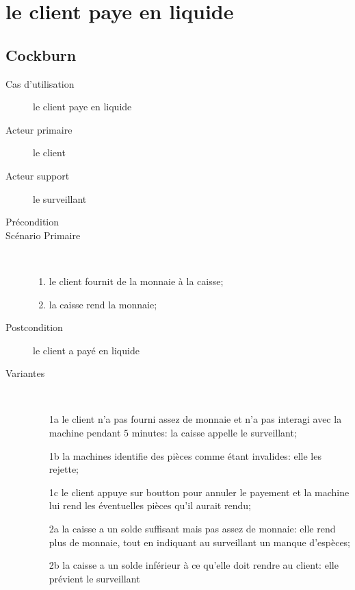 \documentclass[a4paper]{article}
\begin{document}
\newpage

\section{le client paye en liquide}
\subsection{Cockburn}
\begin{description}
	\item[Cas d'utilisation] le client paye en liquide
	\item[Acteur primaire] le client
	\item[Acteur support] le surveillant
	\item[Pr\'econdition]
	\item[Sc\'enario Primaire] \
	\begin{enumerate}
		\item le client fournit de la monnaie \`a la caisse;
		\item la caisse rend la monnaie;
	\end{enumerate}
	\item[Postcondition] le client a pay\'e en liquide
	\item[Variantes] \
	\begin{enumerate}
		\item[1a] le client n'a pas fourni assez de monnaie et n'a
			pas interagi avec la machine pendant $5$ minutes: la
			caisse appelle le surveillant;
		\item[1b] la machines identifie des pi\`eces comme \'etant
			invalides: elle les rejette;
		\item[1c] le client appuye sur boutton pour annuler le
			payement et la machine lui rend les \'eventuelles
			pi\`eces qu'il aurait rendu;
		\item[2a] la caisse a un solde suffisant mais pas assez de
			monnaie: elle rend plus de monnaie, tout en indiquant au
			surveillant un manque d'esp\`eces;
		\item[2b] la caisse a un solde inf\'erieur \`a ce qu'elle doit
			rendre au client: elle pr\'evient le surveillant
	\end{enumerate}
\end{description}
\end{document}
